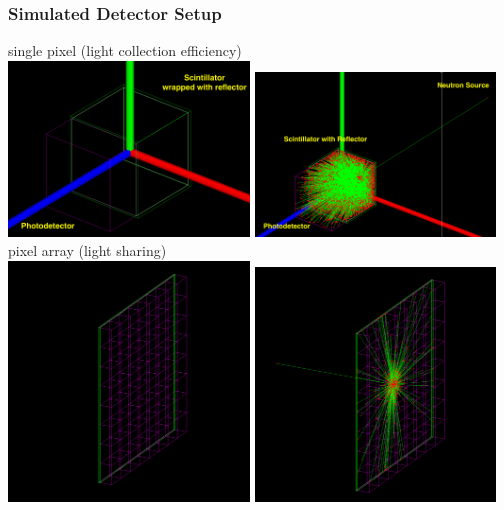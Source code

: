\documentclass[xcolor=x11names, compress, handout]{beamer}
\renewcommand{\(}{\begin{columns}}
\renewcommand{\)}{\end{columns}}
\newcommand{\<}[1]{\begin{column}{#1}}
\renewcommand{\>}{\end{column}}
\begin{document}
\begin{frame}
\frametitle{Simulated Detector Setup}
\scriptsize \centering
single pixel (light collection efficiency) \\
\includegraphics[width=0.48\textwidth, height=0.4\textheight]{images/scint_refl1.png}
\includegraphics[width=0.48\textwidth, height=0.4\textheight]{images/scint_refl_neutron.png}
pixel array (light sharing)\\
\includegraphics[width=0.48\textwidth, height=0.4\textheight]{images/monolithic_pixelarray.png}
\includegraphics[width=0.48\textwidth, height=0.4\textheight]{images/monolithic_pixelarray1.png}
\end{frame}
\end{document}
